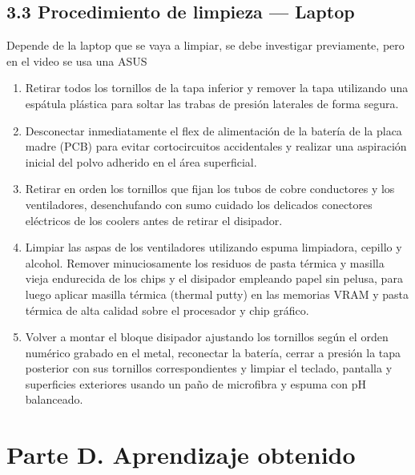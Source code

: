 \documentclass{article}
\begin{document}
\subsection{3.3 Procedimiento de limpieza — Laptop}
\label{sec:org70ddcd2}
Depende de la laptop que se vaya a limpiar, se debe investigar previamente, pero en el video se usa una ASUS
\begin{enumerate}
\item Retirar todos los tornillos de la tapa inferior y remover la tapa utilizando una espátula plástica para soltar las trabas de presión laterales de forma segura.
\item Desconectar inmediatamente el flex de alimentación de la batería de la placa madre (PCB) para evitar cortocircuitos accidentales y realizar una aspiración inicial del polvo adherido en el área superficial.
\item Retirar en orden los tornillos que fijan los tubos de cobre conductores y los ventiladores, desenchufando con sumo cuidado los delicados conectores eléctricos de los coolers antes de retirar el disipador.
\item Limpiar las aspas de los ventiladores utilizando espuma limpiadora, cepillo y alcohol. Remover minuciosamente los residuos de pasta térmica y masilla vieja endurecida de los chips y el disipador empleando papel sin pelusa, para luego aplicar masilla térmica (thermal putty) en las memorias VRAM y pasta térmica de alta calidad sobre el procesador y chip gráfico.
\item Volver a montar el bloque disipador ajustando los tornillos según el orden numérico grabado en el metal, reconectar la batería, cerrar a presión la tapa posterior con sus tornillos correspondientes y limpiar el teclado, pantalla y superficies exteriores usando un paño de microfibra y espuma con pH balanceado.
\end{enumerate}
\section{Parte D. Aprendizaje obtenido}
\label{sec:orgf032c19}
\end{document}
